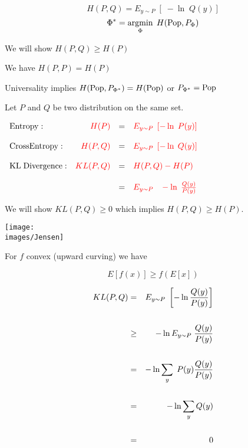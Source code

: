{{\color{red} $$H(P,Q) = E_{y \sim P}\;\left[ \;-\ln \;Q(y)\right]$$}
{\color{red} $$\Phi^* = \operatorname*{argmin}_\Phi \;H(\mathrm{Pop},P_\Phi)$$}

We will show {\color{red} $H(P,Q) \geq H(P)$}

\vfill
We have {\color{red} $H(P,P) = H(P)$}


\vfill
Universality implies {\color{red} $H(\mathrm{Pop},P_{\Phi^*}) = H(\mathrm{Pop})$} or {\color{red} $P_{\Phi^*} = \mathrm{Pop}$}


Let $P$ and $Q$ be two distribution on the same set.

\vfill
\centerline{
  $\begin{array}{lrcl}
\mathrm{Entropy}: & {\color{red} H(P)} & = & {\color{red} E_{y \sim P}\;\left[-\ln\;P(y)\right]} \\
\\
\mathrm{Cross Entropy:} & {\color{red} H(P,Q)} & = & {\color{red} E_{y \sim P}\;\left[-\ln\;Q(y)\right]} \\
\\
\mathrm{KL\; Divergence:} & {\color{red} KL(P,Q)} & = & {\color{red} H(P,Q) - H(P)} \\
\\
& & = & {\color{red} E_{y \sim P}\;\;\; - \ln\;\frac{Q(y)}{P(y)}}
\end{array}$}

\vfill
We will show $KL(P,Q) \geq 0$ which implies $H(P,Q) \geq H(P)$.


\centerline{\texttt{[image: \\images/Jensen]}}

\vfill
For $f$ convex (upward curving) we have

\vfill
$$E[f(x)] \geq f(E[x])$$


\begin{eqnarray*}
  KL(P,Q) & = & E_{y \sim P}\;\left[- \ln \frac{Q(y)}{P(y)}\right] \\
  \\
  & \geq & - \ln E_{y\sim P}\;\frac{Q(y)}{P(y)} \\
  \\
  & = & - \ln \sum_y\; P(y) \frac{Q(y)}{P(y)}  \\
  \\
  & = & - \ln \sum_y Q(y) \\
  \\
  & = & 0
\end{eqnarray*}


}
